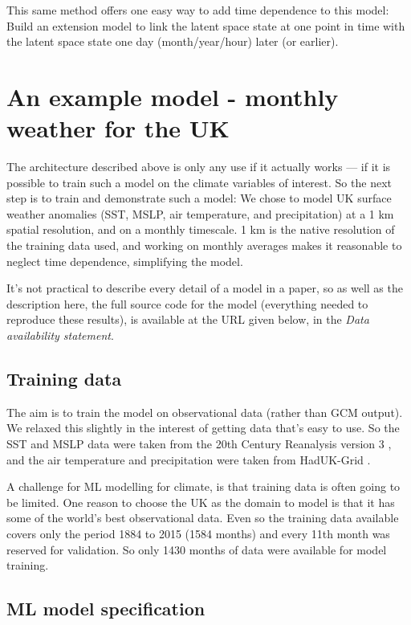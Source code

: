 \documentclass{ametsocV6.1}
\begin{document}
This same method offers one easy way to add time dependence to this model: Build an extension model to link the latent space state at one point in time with the latent space state one day (month/year/hour) later (or earlier).


\section{An example model - monthly weather for the UK}
\label{Example}

The architecture described above is only any use if it actually works --- if it is possible to train such a model on the climate variables of interest. So the next step is to train and demonstrate such a model: We chose to model UK surface weather anomalies (SST, MSLP, air temperature, and precipitation) at a 1 km spatial resolution, and on a monthly timescale. 1 km is the native resolution of the training data used, and working on monthly averages makes it reasonable to neglect time dependence, simplifying the model.

It's not practical to describe every detail of a model in a paper, so as well as the description here, the full source code for the model (everything needed to reproduce these results), is available at the URL given below, in the {\it Data availability statement}.

\subsection{Training data}

The aim is to train the model on observational data (rather than GCM output). We relaxed this slightly in the interest of getting data that's easy to use. So the SST and MSLP data were taken from the 20th Century Reanalysis version 3 \citep{slivinski_20crv3.1}, and the air temperature and precipitation
were taken from HadUK-Grid \citep{HadUK-Grid}.

A challenge for ML modelling for climate, is that training data is often going to be limited. One reason to choose the UK as the domain to model is that it has some of the world's best observational data. Even so the training data available covers only the period 1884 to 2015 (1584 months) and every 11th month was reserved for validation. So only 1430 months of data were available for model training.

\subsection{ML model specification}
\end{document}
